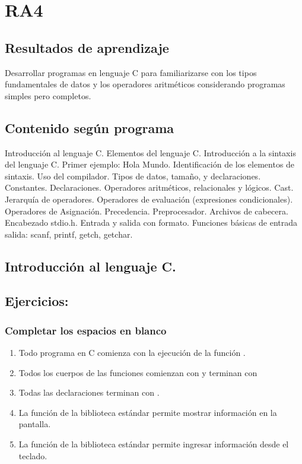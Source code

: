 \section{RA4}
\subsection*{Resultados de aprendizaje}
Desarrollar programas en lenguaje C para familiarizarse con los tipos fundamentales de datos y los operadores aritméticos considerando programas simples pero completos.

\subsection*{Contenido según programa}
Introducción al lenguaje C.  Elementos del lenguaje C.  Introducción a la sintaxis del lenguaje C. Primer ejemplo: Hola Mundo. Identificación de los elementos de sintaxis. Uso del compilador. Tipos de datos, tamaño, y declaraciones.  Constantes. Declaraciones.  Operadores aritméticos, relacionales y lógicos. Cast.  Jerarquía de operadores.  Operadores de evaluación (expresiones condicionales).  Operadores de Asignación.  Precedencia.  Preprocesador. Archivos de cabecera. Encabezado stdio.h. Entrada y salida con formato. Funciones básicas de entrada salida: scanf, printf, getch, getchar.

\subsection*{Introducción al lenguaje C.}
\setcounter{subsection}{3}
\subsection{Ejercicios:}

\subsubsection{Completar los espacios en blanco}
\begin{enumerate}
  \item Todo programa en C comienza con la ejecución de la función \underspace.
  \item Todos los cuerpos de las funciones comienzan con \underspace y terminan con \underspace
  \item Todas las declaraciones terminan con \underspace.
  \item La función \underspace de la biblioteca estándar permite mostrar información en la pantalla.
  \item La función \underspace de la biblioteca estándar permite ingresar información desde el teclado.
\end{enumerate}

